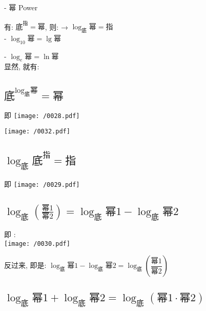 \documentclass[UTF8]{ctexart}
\begin{document}
- 幂 Power

有: $\text{底}^{\text{指}}=\text{幂}$,  则: → $ \log _{\text{底}}\text{幂}=\text{指} $ \\


- $\log _{10}\text{幂}=\lg\text{幂}$

- $\log _e\text{幂}=\ln\text{幂}$ \\

显然, 就有:


\subsection{$\text{底}^{\log _{\text{底}}\text{幂}}=\text{幂}$}

即 
\texttt{[image: /0028.pdf]} \\


\begin{myEnvSample}
\texttt{[image: /0032.pdf]}
\end{myEnvSample}


\dotfill


\subsection{$\log _{\text{底}}\text{底}^{\text{指}}=\text{指}$}

即 
\texttt{[image: /0029.pdf]}


\dotfill



\subsection{$\log _{\text{底}}\left( \frac{\text{幂}1}{\text{幂}2} \right) =\log _{\text{底}}\text{幂}1-\log _{\text{底}}\text{幂}2$}

即 : \\
\texttt{[image: /0030.pdf]}


反过来, 即是:  $\log _{\text{底}}\text{幂}1-\log _{\text{底}}\text{幂}2=\log _{\text{底}}\left( \dfrac{\text{幂}1}{\text{幂}2} \right) $


\dotfill


\subsection{$\log _{\text{底}}\text{幂}1+\log _{\text{底}}\text{幂}2=\log _{\text{底}}\left( \text{幂}1\cdot \text{幂}2 \right) $}
\end{document}
